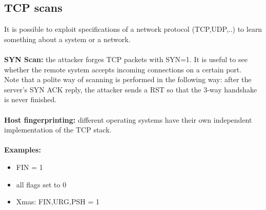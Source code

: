 \documentclass[10pt,a4paper]{book}
\begin{document}
\subsection{TCP scans}
It is possible to exploit specifications of a network protocol (TCP,UDP,..) to learn something about a system or a network.\\\\
\textbf{SYN Scan:} the attacker forges TCP packets with SYN=1. It is useful to see whether the remote system accepts incoming connections on a certain port.\\
Note that a polite way of scanning is performed in the following way: after the server's SYN ACK reply, the attacker sends a RST so that the 3-way handshake is never finished.\\\\
\textbf{Host fingerprinting:} different operating systems have their own independent implementation of the TCP stack.\\\\
\textbf{Examples:}
\begin{itemize}
\item FIN = 1
\item all flags set to 0
\item Xmas: FIN,URG,PSH = 1
\end{itemize}
\newpage
\end{document}
